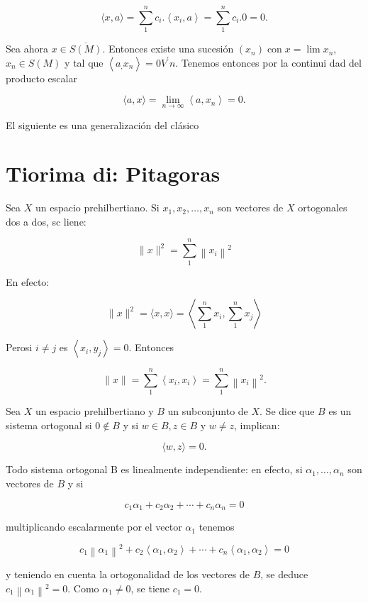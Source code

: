 \documentclass[10pt]{article}
\theoremstyle{plain}
\theoremstyle{definition}
\theoremstyle{remark}
\begin{document}
$$
\langle x, a\rangle=\sum_{1}^{n} c_{i} .\left\langle x_{i}, a\right\rangle=\sum_{1}^{n} c_{i} .0=0 .
$$

Sea ahora $x \in \overline{S(M)}$. Entonces existe una sucesión $\left(x_{n}\right) \operatorname{con} x=\lim x_{n}$, $x_{n} \in S(M)$ y tal que $\left\langle a_{,} x_{n}\right\rangle=0 V^{\prime} n$. Tenemos entonces por la continui dad del producto escalar

$$
\langle a, x\rangle=\lim _{n \rightarrow \infty}\left\langle a, x_{n}\right\rangle=0 .
$$

El siguiente es una generalización del clásico

\section*{Tiorima di: Pitagoras}
Sea $X$ un espacio prehilbertiano. Si $x_{1}, x_{2}, \ldots, x_{n}$ son vectores de $X$ ortogonales dos a dos, sc liene:

$$
\|x\|^{2}=\sum_{1}^{n}\left\|x_{i}\right\|^{2}
$$

En efecto:

$$
\|x\|^{2}=\langle x, x\rangle=\left\langle\sum_{1}^{n} x_{i}, \sum_{1}^{n} x_{j}\right\rangle
$$

Perosi $i \neq j$ es $\left\langle x_{i}, y_{j}\right\rangle=0$. Entonces

$$
\|x\|=\sum_{1}^{n}\left\langle x_{i}, x_{i}\right\rangle=\sum_{1}^{n}\left\|x_{i}\right\|^{2} .
$$

Sea $X$ un espacio prehilbertiano y $B$ un subconjunto de $X$. Se dice que $B$ es un sistema ortogonal si $0 \notin B$ y si $w \in B, z \in B$ y $w \neq z$, implican:


\begin{equation*}
\langle w, z\rangle=0 . \tag{3-6}
\end{equation*}


Todo sistema ortogonal B es linealmente independiente: en efecto, si $\alpha_{1}, \ldots, \alpha_{n}$ son vectores de $B$ y si

$$
c_{1} \alpha_{1}+c_{2} \alpha_{2}+\cdots+c_{n} \alpha_{n}=0
$$

multiplicando escalarmente por el vector $\alpha_{1}$ tenemos

$$
c_{1}\left\|\alpha_{1}\right\|^{2}+c_{2}\left\langle\alpha_{1}, \alpha_{2}\right\rangle+\cdots+c_{n}\left\langle\alpha_{1}, \alpha_{2}\right\rangle=0
$$

y teniendo en cuenta la ortogonalidad de los vectores de $B$, se deduce $c_{1}\left\|\alpha_{1}\right\|^{2}=0$. Como $\alpha_{1} \neq 0$, se tiene $c_{1}=0$.
\end{document}
